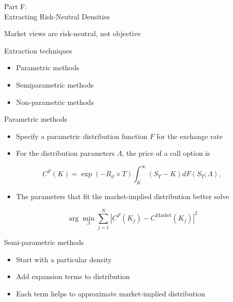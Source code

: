 \begin{frame}{}

\color{blue} \LARGE{Part F:}\\
\LARGE{Extracting Risk-Neutral Densities}

\end{frame}

\begin{frame}{Market views are risk-neutral, not objective}

\end{frame}

\begin{frame}{Extraction techniques}

\begin{itemize}
\tightlist
\item
  Parametric methods
\item
  Semiparametric methods
\item
  Non-parametric methods
\end{itemize}

\end{frame}

\begin{frame}{Parametric methods}

\begin{itemize}
\tightlist
\item
  Specify a parametric distribution function \(F\) for the exchange rate
\item
  For the distribution parameters \(\Lambda\), the price of a call
  option is
\end{itemize}

\[
C^F(K) = \exp(-R_d\times T) \int_{K}^{\infty} \left( S_T - K\right) dF(S_T; \Lambda), 
\]

\begin{itemize}
\tightlist
\item
  The parameters that fit the market-implied distribution better solve
\end{itemize}

\[
\arg\min_{\Lambda} \sum_{j=1}^N |C^F(K_j) - C^{\text{Market}}(K_j)|^2
\]

\end{frame}

\begin{frame}{Semi-parametric methods}

\begin{itemize}
\tightlist
\item
  Start with a particular density
\item
  Add expansion terms to distribution
\item
  Each term helps to approximate market-implied distribution
\end{itemize}

\end{frame}

